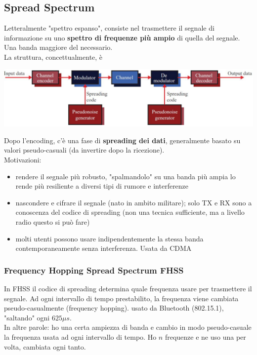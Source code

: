 \newpage

\subsection{Spread Spectrum}
Letteralmente "spettro espanso", consiste nel trasmettere il segnale di informazione su uno \textbf{spettro di frequenze più ampio} di quella del segnale. Una banda maggiore del necessario. \\

La struttura, concettualmente, è
\begin{center}
	\includegraphics[width=0.95\linewidth]{img/wireless/ss1}
\end{center}
Dopo l'encoding, c'è una fase di \textbf{spreading dei dati}, generalmente basato su valori pseudo-casuali (da invertire dopo la ricezione).\\

Motivazioni:
\begin{itemize}
	\item rendere il segnale più robusto, "spalmandolo" su una banda più ampia lo rende più resiliente a diversi tipi di rumore e interferenze
	\item nascondere e cifrare il segnale (nato in ambito militare); solo TX e RX sono a conoscenza del codice di spreading (non una tecnica sufficiente, ma a livello radio questo si può fare)
	\item molti utenti possono usare indipendentemente la stessa banda contemporaneamente senza interferenza. Usata da CDMA
\end{itemize}

\newpage

\subsubsection{Frequency Hopping Spread Spectrum FHSS}

In FHSS il codice di spreading determina quale frequenza usare per trasmettere il segnale. Ad ogni intervallo di tempo prestabilito, la frequenza viene cambiata pseudo-casualmente (frequency hopping). usato da Bluetooth (802.15.1), "saltando" ogni $625 \mu s$.\\
In altre parole: ho una certa ampiezza di banda e cambio in modo pseudo-casuale la frequenza usata ad ogni intervallo di tempo. Ho $n$ frequenze e ne uso una per volta, cambiata ogni tanto.\\

